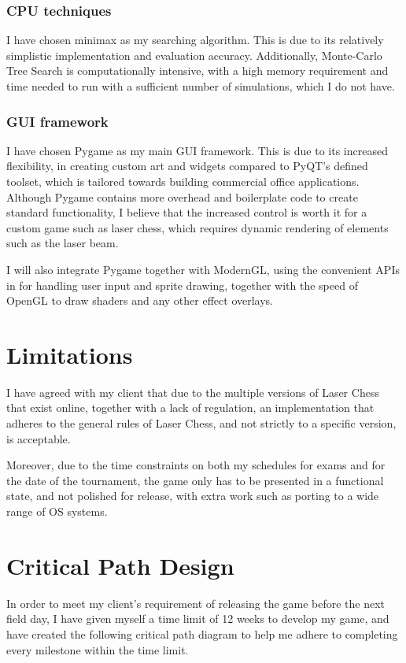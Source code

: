 \documentclass[../main/main.tex]{subfiles}
\begin{document}
\subsubsection*{CPU techniques}
I have chosen minimax as my searching algorithm. This is due to its relatively simplistic implementation and evaluation accuracy. Additionally, Monte-Carlo Tree Search is computationally intensive, with a high memory requirement and time needed to run with a sufficient number of simulations, which I do not have.

\subsubsection*{GUI framework}
I have chosen Pygame as my main GUI framework. This is due to its increased flexibility, in creating custom art and widgets compared to PyQT’s defined toolset, which is tailored towards building commercial office applications. Although Pygame contains more overhead and boilerplate code to create standard functionality, I believe that the increased control is worth it for a custom game such as laser chess, which requires dynamic rendering of elements such as the laser beam.

I will also integrate Pygame together with ModernGL, using the convenient APIs in for handling user input and sprite drawing, together with the speed of OpenGL to draw shaders and any other effect overlays.

\section{Limitations}
I have agreed with my client that due to the multiple versions of Laser Chess that exist online, together with a lack of regulation, an implementation that adheres to the general rules of Laser Chess, and not strictly to a specific version, is acceptable.

Moreover, due to the time constraints on both my schedules for exams and for the date of the tournament, the game only has to be presented in a functional state, and not polished for release, with extra work such as porting to a wide range of OS systems.

\section{Critical Path Design}
In order to meet my client’s requirement of releasing the game before the next field day, I have given myself a time limit of 12 weeks to develop my game, and have created the following critical path diagram to help me adhere to completing every milestone within the time limit.
\end{document}
